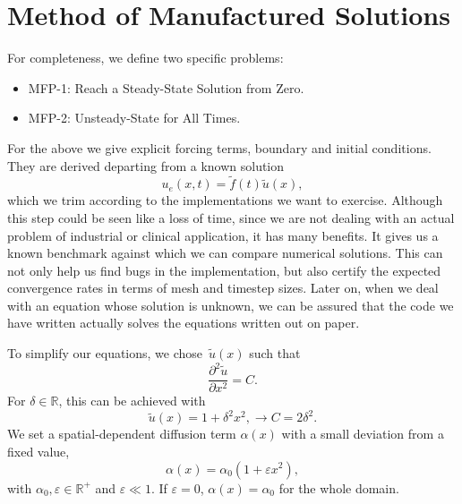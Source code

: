 \documentclass[../main.tex]{subfiles}
\begin{document}
\section{Method of Manufactured Solutions}
\label{sec:1d_fom_toy_problem}

For completeness, we define two specific problems:
\begin{itemize}
    \item MFP-1: Reach a Steady-State Solution from Zero.
    \item MFP-2: Unsteady-State for All Times.
\end{itemize}
For the above we give explicit forcing terms, boundary and initial conditions.
They are derived departing from a known solution
\begin{equation}
    u_e(x,t) = \tilde{f}(t) \tilde{u}(x),
\end{equation}
which we trim according to the implementations we want to exercise.
Although this step could be seen like a loss of time, since we are not dealing with an actual problem of industrial or clinical application, it has many benefits.
It gives us a known benchmark against which we can compare numerical solutions.
This can not only help us find bugs in the implementation, but also certify the expected convergence rates in terms of mesh and timestep sizes.
Later on, when we deal with an equation whose solution is unknown, we can be assured that the code we have written actually solves the equations written out on paper. 

To simplify our equations, we chose~$\tilde{u}(x)$ such that
\begin{equation}
    \frac{\partial^2\tilde{u}}{\partial x^2} = C.
\end{equation}
For $\delta\in\mathbb{R}$, this can be achieved with 
\begin{equation}
    \tilde{u}(x) = 1 + \delta^2 x^2, \rightarrow C = 2 \delta^2.
\end{equation}
We set a spatial-dependent diffusion term $\alpha(x)$ with a small deviation from a fixed value,
\begin{equation}
    \label{eq:1d_fom_mfp_diffusion_term}
    \alpha(x) = \alpha_0(1 + \varepsilon x^2),
\end{equation}
with $\alpha_0, \varepsilon \in \mathbb{R}^{+}$ and $\varepsilon \ll 1$.
If $\varepsilon=0$, $\alpha(x) = \alpha_0$ for the whole domain.

\end{document}
